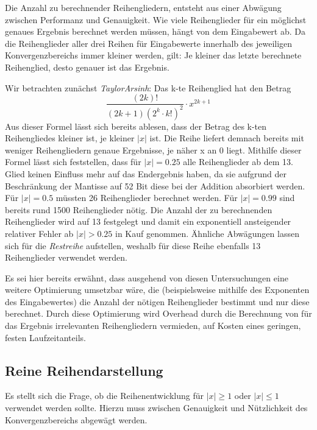 \documentclass[course=erap] {aspdoc}
\begin{document}
    Die Anzahl zu berechnender Reihengliedern, entsteht aus einer Abwägung zwischen Performanz und Genauigkeit.
    Wie viele Reihenglieder für ein möglichst genaues Ergebnis berechnet werden müssen, hängt von dem Eingabewert ab.
    Da die Reihenglieder aller drei Reihen für Eingabewerte innerhalb des jeweiligen Konvergenzbereichs immer kleiner werden, gilt:
    Je kleiner das letzte berechnete Reihenglied, desto genauer ist das Ergebnis.

    Wir betrachten zunächst \textit{TaylorArsinh}:
    Das k-te Reihenglied hat den Betrag
    \[
        \frac{(2k)!}{(2k + 1)(2^k \cdot k!)^2}\cdot x^{2k+1}
    \]
    Aus dieser Formel lässt sich bereits ablesen, dass der Betrag des k-ten Reihengliedes kleiner ist, je kleiner $|x|$ ist.
    Die Reihe liefert demnach bereits mit weniger Reihengliedern genaue Ergebnisse, je näher x an 0 liegt.
    Mithilfe dieser Formel lässt sich feststellen, dass für $|x| = 0.25$ alle Reihenglieder ab dem 13. Glied keinen Einfluss mehr auf das Endergebnis haben, da sie aufgrund der Beschränkung der Mantisse auf 52 Bit diese bei der Addition absorbiert werden.
    Für $|x| = 0.5$ müssten 26 Reihenglieder berechnet werden.
    Für $|x| = 0.99$ sind bereits rund 1500 Reihenglieder nötig.
    Die Anzahl der zu berechnenden Reihenglieder wird auf 13 festgelegt und damit ein exponentiell ansteigender relativer Fehler ab $|x| > 0.25$ in Kauf genommen.
    Ähnliche Abwägungen lassen sich für die \textit{Restreihe} aufstellen, weshalb für diese Reihe ebenfalls 13 Reihenglieder verwendet werden.

    Es sei hier bereits erwähnt, dass ausgehend von diesen Untersuchungen eine weitere Optimierung umsetzbar wäre, die (beispielsweise mithilfe des Exponenten des Eingabewertes) die Anzahl der nötigen Reihenglieder bestimmt und nur diese berechnet.
    Durch diese Optimierung wird Overhead durch die Berechnung von für das Ergebnis irrelevanten Reihengliedern vermieden, auf Kosten eines geringen, festen Laufzeitanteils.

    \subsection{Reine Reihendarstellung}\label{subsec:reine-reihendarstellung}

    Es stellt sich die Frage, ob die Reihenentwicklung für $|x|\geq1$ oder $|x|\leq1$ verwendet werden sollte. Hierzu muss zwischen Genauigkeit und Nützlichkeit des Konvergenzbereichs abgewägt werden.
\end{document}
